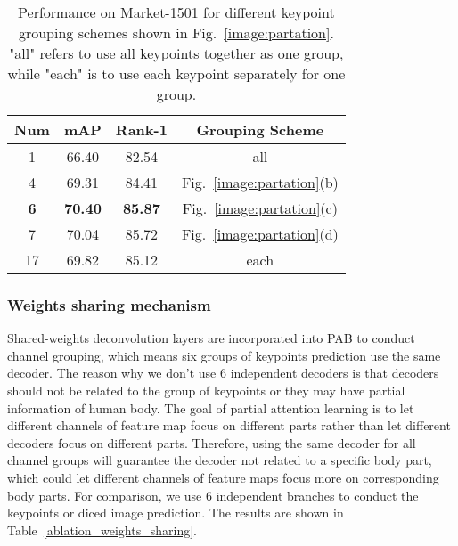 \documentclass[10pt,twocolumn,letterpaper]{article}
\begin{document}
\begin{table}[htbp]
	\begin{center}
		\newcommand{\tabincell}[2]{\begin{tabular}{@{}#1@{}}#2\end{tabular}}
		\begin{tabular}{cccc}
			\hline
			Num  & mAP & Rank-1  & Grouping Scheme \bigstrut\\
			\hline
			1 & 66.40 & 82.54 & all\\
			4 & 69.31 & 84.41 & Fig.~\ref{image:partation}(b)\\
			\bf{6} & \bf{70.40} & \bf{85.87} & Fig.~\ref{image:partation}(c) \\
			7 & 70.04 & 85.72 & Fig.~\ref{image:partation}(d)\\
			17 & 69.82 & 85.12 & each\\		
			\hline
		\end{tabular}
	\end{center}
	\caption{Performance on Market-1501 for different keypoint grouping schemes shown in Fig.~\ref{image:partation}. "all" refers to use all keypoints together as one group, while "each" is to use each keypoint separately for one group.}
	\label{ablation_keypoint_group}
\end{table}

\subsubsection{Weights sharing mechanism}
Shared-weights deconvolution layers are incorporated into PAB to conduct channel grouping, which means six groups of keypoints prediction use the same decoder. The reason why we don't use 6 independent decoders is that decoders should not be related to the group of keypoints or they may have partial information of human body. The goal of partial attention learning is to let different channels of feature map focus on different parts rather than let different decoders focus on different parts. Therefore, using the same decoder for all channel groups will guarantee the decoder not related to a specific body part, which could let different channels of feature maps focus more on corresponding body parts. For comparison, we use 6 independent branches to conduct the keypoints or diced image prediction. The results are shown in Table~\ref{ablation_weights_sharing}.
\end{document}
